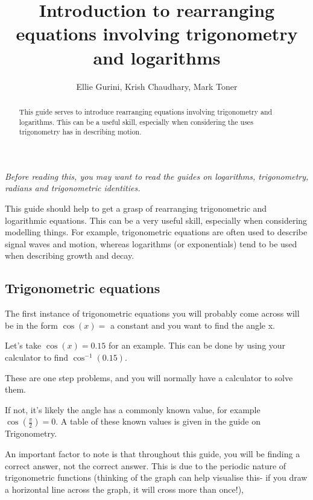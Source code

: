 \documentclass[
  12pt,
  a4paper, oneside]{starmastarticle}
\title{Introduction to rearranging equations involving trigonometry and
logarithms}
\author{Ellie Gurini, Krish Chaudhary, Mark Toner}
\date{}
\begin{document}
\maketitle
\begin{abstract}
This guide serves to introduce rearranging equations involving
trigonometry and logarithms. This can be a useful skill, especially when
considering the uses trigonometry has in describing motion.
\end{abstract}
\ifdefined\Shaded\renewenvironment{Shaded}{\begin{tcolorbox}[frame hidden, interior hidden, enhanced, sharp corners, breakable, boxrule=0pt, borderline west={3pt}{0pt}{shadecolor}]}{\end{tcolorbox}}\fi

\emph{Before reading this, you may want to read the guides on
logarithms, trigonometry, radians and trigonometric identities.}

This guide should help to get a grasp of rearranging trigonometric and
logarithmic equations. This can be a very useful skill, especially when
considering modelling things. For example, trigonometric equations are
often used to describe signal waves and motion, whereas logarithms (or
exponentials) tend to be used when describing growth and decay.

\hypertarget{trigonometric-equations}{%
\subsection*{Trigonometric equations}\label{trigonometric-equations}}

The first instance of trigonometric equations you will probably come
across will be in the form \(\cos(x)=\) a constant and you want to find
the angle x.

Let's take \(\cos(x)=0.15\) for an example. This can be done by using
your calculator to find \(\cos^{-1}(0.15)\).

These are one step problems, and you will normally have a calculator to
solve them.

If not, it's likely the angle has a commonly known value, for example
\(\cos(\frac{\pi}{2})=0\). A table of these known values is given in the
guide on Trigonometry.

An important factor to note is that throughout this guide, you will be
finding a correct answer, not the correct answer. This is due to the
periodic nature of trigonometric functions (thinking of the graph can
help visualise this- if you draw a horizontal line across the graph, it
will cross more than once!),
\end{document}
